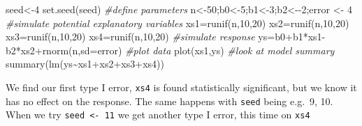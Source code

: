 \documentclass[
]{book}
\newenvironment{Shaded}{\begin{snugshade}}{\end{snugshade}}
\newcommand{\AttributeTok}[1]{\textcolor[rgb]{0.77,0.63,0.00}{#1}}
\newcommand{\CommentTok}[1]{\textcolor[rgb]{0.56,0.35,0.01}{\textit{#1}}}
\newcommand{\DecValTok}[1]{\textcolor[rgb]{0.00,0.00,0.81}{#1}}
\newcommand{\FunctionTok}[1]{\textcolor[rgb]{0.00,0.00,0.00}{#1}}
\newcommand{\NormalTok}[1]{#1}
\newcommand{\OtherTok}[1]{\textcolor[rgb]{0.56,0.35,0.01}{#1}}
\newcommand{\SpecialCharTok}[1]{\textcolor[rgb]{0.00,0.00,0.00}{#1}}
\begin{document}
\begin{Shaded}
\begin{Highlighting}[]
\NormalTok{seed}\OtherTok{\textless{}{-}}\DecValTok{4}
\FunctionTok{set.seed}\NormalTok{(seed)}
\CommentTok{\#define parameters}
\NormalTok{n}\OtherTok{\textless{}{-}}\DecValTok{50}\NormalTok{;b0}\OtherTok{\textless{}{-}}\DecValTok{5}\NormalTok{;b1}\OtherTok{\textless{}{-}}\DecValTok{3}\NormalTok{;b2}\OtherTok{\textless{}{-}}\SpecialCharTok{{-}}\DecValTok{2}\NormalTok{;error }\OtherTok{\textless{}{-}} \DecValTok{4}
\CommentTok{\#simulate potential explanatory variables}
\NormalTok{xs1}\OtherTok{=}\FunctionTok{runif}\NormalTok{(n,}\DecValTok{10}\NormalTok{,}\DecValTok{20}\NormalTok{)}
\NormalTok{xs2}\OtherTok{=}\FunctionTok{runif}\NormalTok{(n,}\DecValTok{10}\NormalTok{,}\DecValTok{20}\NormalTok{)}
\NormalTok{xs3}\OtherTok{=}\FunctionTok{runif}\NormalTok{(n,}\DecValTok{10}\NormalTok{,}\DecValTok{20}\NormalTok{)}
\NormalTok{xs4}\OtherTok{=}\FunctionTok{runif}\NormalTok{(n,}\DecValTok{10}\NormalTok{,}\DecValTok{20}\NormalTok{)}
\CommentTok{\#simulate response}
\NormalTok{ys}\OtherTok{=}\NormalTok{b0}\SpecialCharTok{+}\NormalTok{b1}\SpecialCharTok{*}\NormalTok{xs1}\SpecialCharTok{{-}}\NormalTok{b2}\SpecialCharTok{*}\NormalTok{xs2}\SpecialCharTok{+}\FunctionTok{rnorm}\NormalTok{(n,}\AttributeTok{sd=}\NormalTok{error)}
\CommentTok{\#plot data}
\FunctionTok{plot}\NormalTok{(xs1,ys)}
\CommentTok{\#look at model summary}
\FunctionTok{summary}\NormalTok{(}\FunctionTok{lm}\NormalTok{(ys}\SpecialCharTok{\textasciitilde{}}\NormalTok{xs1}\SpecialCharTok{+}\NormalTok{xs2}\SpecialCharTok{+}\NormalTok{xs3}\SpecialCharTok{+}\NormalTok{xs4))}
\end{Highlighting}
\end{Shaded}

We find our first type I error, \texttt{xs4} is found statistically significant, but we know it has no effect on the response. The same happens with \texttt{seed} being e.g.~9, 10. When we try \texttt{seed\ \textless{}-\ 11} we get another type I error, this time on \texttt{xs4}
\end{document}
